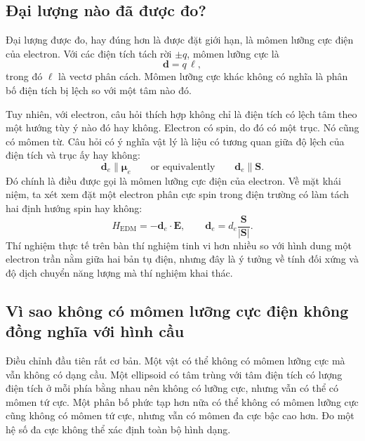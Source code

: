 \subsection{Đại lượng nào đã được đo?}

Đại lượng được đo, hay đúng hơn là được đặt giới hạn, là mômen lưỡng cực điện của electron. Với các điện tích tách rời \(\pm q\), mômen lưỡng cực là
\begin{equation}
\mathbf d = q\,\boldsymbol{\ell},
\end{equation}
trong đó \(\boldsymbol{\ell}\) là vectơ phân cách. Mômen lưỡng cực khác không có nghĩa là phân bố điện tích bị lệch so với một tâm nào đó.

Tuy nhiên, với electron, câu hỏi thích hợp không chỉ là điện tích có lệch tâm theo một hướng tùy ý nào đó hay không. Electron có spin, do đó có một trục. Nó cũng có mômen từ. Câu hỏi có ý nghĩa vật lý là liệu có tương quan giữa độ lệch của điện tích và trục ấy hay không:
\begin{equation}
\mathbf d_e \parallel \boldsymbol{\mu}_e
\qquad \text{or equivalently} \qquad
\mathbf d_e \parallel \mathbf S .
\end{equation}
Đó chính là điều được gọi là mômen lưỡng cực điện của electron. Về mặt khái niệm, ta xét xem đặt một electron phân cực spin trong điện trường có làm tách hai định hướng spin hay không:
\begin{equation}
H_{\mathrm{EDM}}=-\mathbf d_e\cdot \mathbf E,
\qquad
\mathbf d_e=d_e\frac{\mathbf S}{|\mathbf S|}.
\end{equation}
Thí nghiệm thực tế trên bàn thí nghiệm tinh vi hơn nhiều so với hình dung một electron trần nằm giữa hai bản tụ điện, nhưng đây là ý tưởng về tính đối xứng và độ dịch chuyển năng lượng mà thí nghiệm khai thác.

\subsection{Vì sao không có mômen lưỡng cực điện không đồng nghĩa với hình cầu}

Điều chỉnh đầu tiên rất cơ bản. Một vật có thể không có mômen lưỡng cực mà vẫn không có dạng cầu. Một ellipsoid có tâm trùng với tâm điện tích có lượng điện tích ở mỗi phía bằng nhau nên không có lưỡng cực, nhưng vẫn có thể có mômen tứ cực. Một phân bố phức tạp hơn nữa có thể không có mômen lưỡng cực cũng không có mômen tứ cực, nhưng vẫn có mômen đa cực bậc cao hơn. Đo một hệ số đa cực không thể xác định toàn bộ hình dạng.

